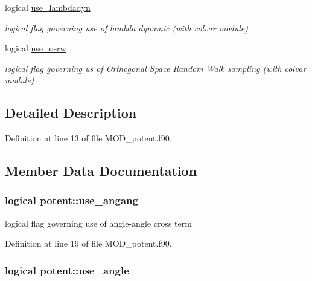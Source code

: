 \begin{DoxyCompactItemize}
logical \hyperlink{classpotent_a208bb4052d3f534fae41d09bf30f9cca}{use\-\_\-lambdadyn}
\begin{DoxyCompactList}\small\item\em logical flag governing use of lambda dynamic (with colvar module) \end{DoxyCompactList}\item 
logical \hyperlink{classpotent_a6ff9ada206ae29ab9d2dfa369165fbb9}{use\-\_\-osrw}
\begin{DoxyCompactList}\small\item\em logical flag governing us of Orthogonal Space Random Walk sampling (with colvar module) \end{DoxyCompactList}\end{DoxyCompactItemize}


\subsection{Detailed Description}


Definition at line 13 of file M\-O\-D\-\_\-potent.\-f90.



\subsection{Member Data Documentation}
\hypertarget{classpotent_a77de48b809f305bc091a799a5c724c04}{
\subsubsection[{use\-\_\-angang}]{\setlength{\rightskip}{0pt plus 5cm}logical potent\-::use\-\_\-angang}}\label{classpotent_a77de48b809f305bc091a799a5c724c04}


logical flag governing use of angle-\/angle cross term 



Definition at line 19 of file M\-O\-D\-\_\-potent.\-f90.

\hypertarget{classpotent_a23350abb90bb736d08920da956e9eef1}{
\subsubsection[{use\-\_\-angle}]{\setlength{\rightskip}{0pt plus 5cm}logical potent\-::use\-\_\-angle}}\label{classpotent_a23350abb90bb736d08920da956e9eef1}


